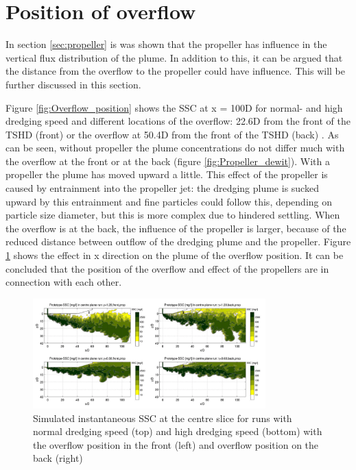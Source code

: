 %







\newpage
\section{Position of overflow}
\label{sec:position_overflow}

In section \ref{sec:propeller} is was shown that the propeller has influence in the vertical flux distribution of the plume. In addition to this, it can be argued that the distance from the overflow to the propeller could have influence. This will be further discussed in this section. \newline

\noindent Figure \ref{fig:Overflow_position} shows the SSC at x = 100D for normal- and high dredging speed and different locations of the overflow: 22.6D from the front of the TSHD (front) or the overflow at 50.4D from the front of the TSHD (back) \citep{Dewit}. As can be seen, without propeller the plume concentrations do not differ much with the overflow at the front or at the back (figure \ref{fig:Propeller_dewit}). With a propeller the plume has moved upward a little. This effect of the propeller is caused by entrainment into the propeller jet: the dredging plume is sucked upward by this entrainment and fine particles could follow this, depending on particle size diameter, but this is more complex due to hindered settling. When the overflow is at the back, the influence of the propeller is larger, because of the reduced distance between outflow of the dredging plume and the propeller. Figure \ref{fig:Overflow_position2} shows the effect in x direction on the plume of the overflow position. It can be concluded that the position of the overflow and effect of the propellers are in connection with each other. 

\begin{figure}[ht!]
    \centering
    \includegraphics[width = 0.8\textwidth]{Images/Overflow_position_normal_high.png}
    \caption{Simulated instantaneous SSC at the centre slice for runs with normal dredging speed (top) and high dredging speed (bottom) with the overflow position in the front (left) and overflow position on the back (right)}
    \label{fig:Overflow_position2}
\end{figure}



